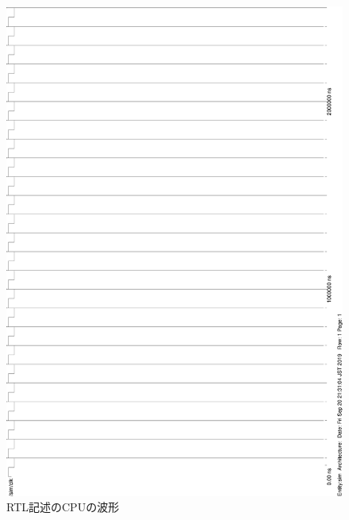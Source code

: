 \documentclass[a4j]{jarticle}
\begin{document}
\begin{figure}[p]
    \vspace*{-20mm}
    \begin{center}
        \includegraphics[height=\textheight]{wave-rtl1.eps}\\[10mm]
        RTL記述のCPUの波形
    \end{center}
\end{figure}
\end{document}
